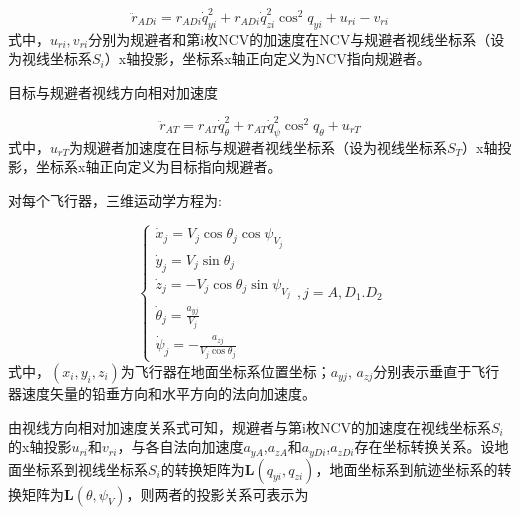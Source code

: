 \begin{equation}
\label{eq:3}
{\ddot r_{ADi}} = {r_{ADi}}\dot q_{yi}^2 + {r_{ADi}}\dot q_{zi}^2{\cos ^2}{q_{yi}} + {u_{ri}} - {v_{ri}}
\end{equation}
式中，${u_{ri}},{v_{ri}}$分别为规避者和第i枚NCV的加速度在NCV与规避者视线坐标系（设为视线坐标系${S_i}$）x轴投影，坐标系x轴正向定义为NCV指向规避者。

目标与规避者视线方向相对加速度

\begin{equation}
\label{eq:4}
{\ddot r_{AT}} = {r_{AT}}\dot q_\theta ^2 + {r_{AT}}\dot q_\psi ^2{\cos ^2}{q_\theta } + {u_{rT}}
\end{equation}
式中，${u_{rT}}$为规避者加速度在目标与规避者视线坐标系（设为视线坐标系${S_T}$）x轴投影，坐标系x轴正向定义为目标指向规避者。

对每个飞行器，三维运动学方程为:

\begin{equation}
\label{eq:5}
\left\{ {\begin{array}{*{20}{l}}
  {{{\dot x}_j} = {V_j}\cos {\theta _j}\cos {\psi _{{V_j}}}} \\ 
  {{{\dot y}_j} = {V_j}\sin {\theta _j}} \\ 
  {{{\dot z}_j} =  - {V_j}\cos {\theta _j}\sin {\psi _{{V_j}}}} \\ 
  {{{\dot \theta }_j} = \frac{{{a_{yj}}}}{{{V_j}}}} \\ 
  {{{\dot \psi }_j} =  - \frac{{{a_{zj}}}}{{{V_j}\cos {\theta _j}}}} 
\end{array},j = A,{D_1}.{D_2}} \right.
\end{equation}
式中，$({x_i},{y_i},{z_i})$为飞行器在地面坐标系位置坐标；${a_{yj}}$, ${a_{zj}}$分别表示垂直于飞行器速度矢量的铅垂方向和水平方向的法向加速度。

由视线方向相对加速度关系式可知，规避者与第i枚NCV的加速度在视线坐标系${S_i}$的x轴投影${u_{ri}}$和${v_{ri}}$，与各自法向加速度${a_{yA}}$,${a_{zA}}$和${a_{yDi}}$,${a_{zDi}}$存在坐标转换关系。设地面坐标系到视线坐标系${S_i}$的转换矩阵为${\mathbf{L}}({q_{yi}},{q_{zi}})$，地面坐标系到航迹坐标系的转换矩阵为${\mathbf{L}}(\theta ,{\psi _V})$，则两者的投影关系可表示为

